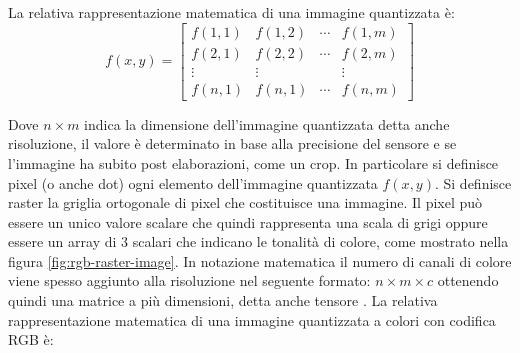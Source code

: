 La relativa rappresentazione matematica di una immagine quantizzata è:
\[ f(x, y)=\left[\begin{array}{cccc}f(1,1) & f(1,2) & \cdots & f(1, m) \\ f(2,1) & f(2,2) & \cdots & f(2, m) \\ \vdots & \vdots & & \vdots \\ f(n,1) & f(n,1) & \cdots & f(n,m)\end{array}\right] \]

Dove \(n\times m\) indica la dimensione dell'immagine quantizzata detta anche risoluzione, il valore è determinato in base alla precisione del sensore e se l'immagine ha subito post elaborazioni, come un crop. In particolare si definisce pixel  (o anche dot) ogni elemento dell'immagine quantizzata \(f(x, y)\). Si definisce raster la griglia ortogonale di pixel che costituisce una immagine. Il pixel può essere un unico valore scalare che quindi rappresenta una scala di grigi oppure essere un array di 3 scalari che indicano le tonalità di colore, come mostrato nella figura \cref{fig:rgb-raster-image}. In notazione matematica il numero di canali di colore viene spesso aggiunto alla risoluzione nel seguente formato: \(n\times m \times c\) ottenendo quindi una matrice a più dimensioni, detta anche tensore \cite{gonzalez_dip}. La relativa rappresentazione matematica di una immagine quantizzata a colori con codifica RGB è:

